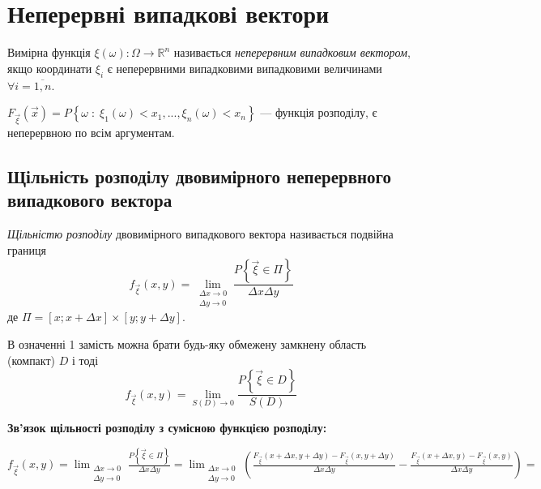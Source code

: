 \section{Неперервні випадкові вектори}

\begin{definition}
    Вимірна функція $\xi(\omega): \Omega \rightarrow \mathbb{R}^n$ називається 
    \emph{неперервним випадковим вектором}, якщо координати $\xi_i$ є 
    неперервними випадковими випадковими величинами $\forall i = \overline{1,n}$.
\end{definition}
\begin{remark}
    $F_{\vec{\xi}}\left(\vec{x}\right) = 
    P\left\{\omega\;:\;\xi_1(\omega)<x_1,...,\xi_n(\omega)<x_n\right\}$ --- 
    функція розподілу, є неперервною по всім аргументам.
\end{remark}

\subsection{Щільність розподілу двовимірного неперервного випадкового вектора}
\begin{definition}
    \emph{Щільністю розподілу} двовимірного випадкового вектора називається 
    подвійна границя
    \begin{equation}
        f_{\vec{\xi}}(x, y) = \lim_{\substack{\Delta x \to 0 \\ 
        \Delta y \to 0}} \frac{P\left\{\vec{\xi} \in \Pi\right\}}
        {\Delta x \Delta y}
    \end{equation}
    де $\Pi = \left[x; x+\Delta x\right] \times \left[y; y+\Delta y\right]$.
\end{definition}
\begin{remark}
    В означенні 1 замість можна брати будь-яку обмежену замкнену область (компакт) 
    $D$ і тоді
    \begin{equation*}
        f_{\vec{\xi}}(x, y) = \lim_{S(D) \to 0} 
        \frac{P\left\{\vec{\xi} \in D\right\}}
        {S(D)}
    \end{equation*}
\end{remark}

\noindent\textbf{Зв’язок щільності розподілу з сумісною функцією розподілу: }

$f_{\vec{\xi}}(x, y) = \lim_{\substack{\Delta x \to 0 \\ 
\Delta y \to 0}} \frac{P\left\{\vec{\xi} \in \Pi\right\}}
{\Delta x \Delta y} = 
\lim_{\substack{\Delta x \to 0 \\ \Delta y \to 0}} 
\left(
    \frac{F_{\vec{\xi}}(x+\Delta x, y+\Delta y) - F_{\vec{\xi}}(x, y+\Delta y)}
    {\Delta x \Delta y}
    -
    \frac{F_{\vec{\xi}}(x+\Delta x, y) - F_{\vec{\xi}}(x, y)}
    {\Delta x \Delta y}
\right) =$

